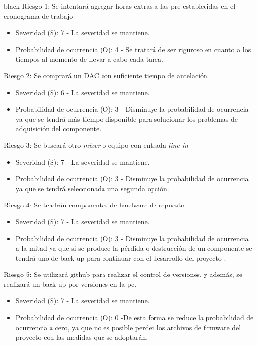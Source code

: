 \documentclass[11pt]{charter}
\begin{document}
\begin{consigna}{black}
Riesgo 1: Se intentará agregar horas extras a las pre-establecidas en el cronograma de trabajo
\begin{itemize}
\item Severidad (S): 7 - La severidad se mantiene.
\item Probabilidad de ocurrencia (O): 4 - Se tratará de ser riguroso en cuanto a los tiempos al momento de llevar a cabo cada tarea.
\end{itemize}

Riesgo 2: Se comprará un DAC con suficiente tiempo de antelación
\begin{itemize}
\item Severidad (S): 6 - La severidad se mantiene.
\item Probabilidad de ocurrencia (O): 3 - Disminuye la probabilidad de ocurrencia ya que se tendrá más tiempo disponible para solucionar los problemas de adquisición del componente.
\end{itemize}

Riesgo 3: Se buscará otro \textit{mixer} o equipo con entrada \textit{line-in}
\begin{itemize}
\item Severidad (S): 7 - La severidad se mantiene.
\item Probabilidad de ocurrencia (O): 3 - Disminuye la probabilidad de ocurrencia ya que se tendrá seleccionada una segunda opción.  
\end{itemize}

Riesgo 4: Se tendrán componentes de hardware de repuesto
\begin{itemize}
\item Severidad (S): 7 - La severidad se mantiene.
\item Probabilidad de ocurrencia (O): 3 - Disminuye la probabilidad de ocurrencia a la mitad ya que si se produce la pérdida o destrucción de un componente se tendrá uno de back up para continuar con el desarrollo del proyecto .
\end{itemize}

Riesgo 5: Se utilizará github para realizar el control de versiones, y además, se realizará un back up por versiones en la pc.
\begin{itemize}
\item Severidad (S): 7 - La severidad se mantiene.
\item Probabilidad de ocurrencia (O): 0 -De esta forma se reduce la probabilidad de ocurrencia a cero, ya que no es posible perder los archivos de firmware del proyecto con las medidas que se adoptarán.
\end{itemize}
\end{consigna}
\end{document}
